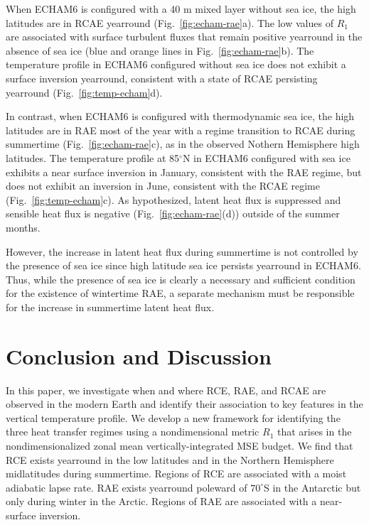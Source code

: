\documentclass{ametsocV5}
\begin{document}
    When ECHAM6 is configured with a 40 m mixed layer without sea ice, the high latitudes are in RCAE yearround (Fig.~\ref{fig:echam-rae}a). The low values of $R_1$ are associated with surface turbulent fluxes that remain positive yearround in the absence of sea ice (blue and orange lines in Fig.~\ref{fig:echam-rae}b). The temperature profile in ECHAM6 configured without sea ice does not exhibit a surface inversion yearround, consistent with a state of RCAE persisting yearround (Fig.~\ref{fig:temp-echam}d). 

    In contrast, when ECHAM6 is configured with thermodynamic sea ice, the high latitudes are in RAE most of the year with a regime transition to RCAE during summertime (Fig.~\ref{fig:echam-rae}c), as in the observed Nothern Hemisphere high latitudes. The temperature profile at 85$^\circ$N in ECHAM6 configured with sea ice exhibits a near surface inversion in January, consistent with the RAE regime, but does not exhibit an inversion in June, consistent with the RCAE regime (Fig.~\ref{fig:temp-echam}c). As hypothesized, latent heat flux is suppressed and sensible heat flux is negative (Fig.~\ref{fig:echam-rae}(d)) outside of the summer months. 
    
    However, the increase in latent heat flux during summertime is not controlled by the presence of sea ice since high latitude sea ice persists yearround in ECHAM6. Thus, while the presence of sea ice is clearly a necessary and sufficient condition for the existence of wintertime RAE, a separate mechanism must be responsible for the increase in summertime latent heat flux.

\section{Conclusion and Discussion}

In this paper, we investigate when and where RCE, RAE, and RCAE are observed in the modern Earth and identify their association to key features in the vertical temperature profile. We develop a new framework for identifying the three heat transfer regimes using a nondimensional metric $R_1$ that arises in the nondimensionalized zonal mean vertically-integrated MSE budget. We find that RCE exists yearround in the low latitudes and in the Northern Hemisphere midlatitudes during summertime. Regions of RCE are associated with a moist adiabatic lapse rate. RAE exists yearround poleward of $70^\circ$S in the Antarctic but only during winter in the Arctic. Regions of RAE are associated with a near-surface inversion.
\end{document}
